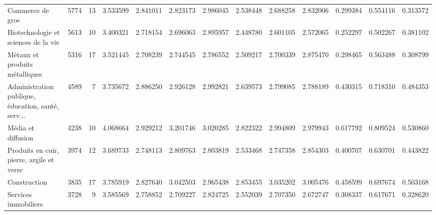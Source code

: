 \begin{tabular}{lrrrrrrrrrrrr}
Commerce de gros                                   &          5774 &             13 &     3.533599 &              2.841011 &            2.823173 &                 2.986045 &               2.538448 &                  2.688258 &                   2.832006 &                   0.299384 &  0.554116 &             0.313572 \\
Biotechnologie et sciences de la vie               &          5613 &             10 &     3.400321 &              2.718154 &            2.696063 &                 2.895957 &               2.448780 &                  2.601105 &                   2.572065 &                   0.252297 &  0.502267 &             0.381102 \\
Métaux et produits métalliques                     &          5316 &             17 &     3.521445 &              2.708239 &            2.744545 &                 2.786552 &               2.509217 &                  2.700339 &                   2.875470 &                   0.298465 &  0.563488 &             0.308799 \\
Administration publique, éducation, santé, serv... &          4589 &              7 &     3.735672 &              2.886250 &            2.926128 &                 2.992821 &               2.639573 &                  2.799085 &                   2.788189 &                   0.430315 &  0.718310 &             0.484353 \\
Média et diffusion                                 &          4238 &             10 &     4.068664 &              2.929212 &            3.201746 &                 3.020285 &               2.822322 &                  2.994809 &                   2.979943 &                   0.617792 &  0.809524 &             0.530860 \\
Produits en cuir, pierre, argile et verre          &          3974 &             12 &     3.689733 &              2.748113 &            2.809763 &                 2.803819 &               2.533468 &                  2.747358 &                   2.854303 &                   0.400707 &  0.630701 &             0.443822 \\
Construction                                       &          3835 &             17 &     3.785919 &              2.827640 &            3.042503 &                 2.965438 &               2.853455 &                  3.035202 &                   3.005476 &                   0.458599 &  0.697674 &             0.503168 \\
Services immobiliers                               &          3728 &              9 &     3.585569 &              2.758852 &            2.709227 &                 2.824725 &               2.552039 &                  2.707350 &                   2.672747 &                   0.308337 &  0.617671 &             0.328620 \\

\end{tabular}

